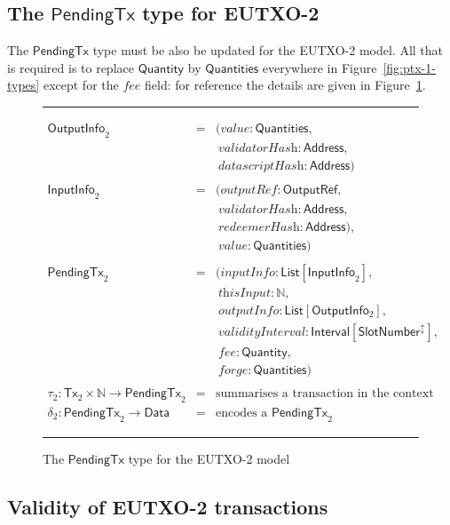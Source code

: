\documentclass[a4paper]{article}
\renewcommand{\i}{\textit}  %
\newcommand{\s}{\textsf}  %
\newcommand{\msf}[1]{\ensuremath{\mathsf{#1}}}
\newcommand{\mi}[1]{\ensuremath{\mathit{#1}}}
\newcommand\rfskip{7pt}
\newenvironment{ruledfigure}[1]{\begin{figure}[#1]\hrule\vspace{\rfskip}}{\vspace{\rfskip}\hrule\end{figure}}
\newcommand{\List}[1]{\ensuremath{\s{List}[#1]}}
\newcommand{\Interval}[1]{\ensuremath{\s{Interval}[#1]}}
\newcommand{\extended}[1]{#1^\updownarrow}
\newcommand{\ptx}{\ensuremath{\s{PendingTx}}}
\newcommand{\forge}{\mi{forge}}
\newcommand{\fee}{\mi{fee}}
\newcommand{\val}{\mi{value}}  %
\newcommand{\Data}{\ensuremath{\s{Data}}}
\newcommand{\outputref}{\mi{outputRef}}
\newcommand{\slotnum}{\ensuremath{\s{SlotNumber}}}
\newcommand{\eutxotx}{\msf{Tx}}
\newcommand{\qty}{\ensuremath{\s{Quantity}}}
\newcommand{\qtymap}{\ensuremath{\s{Quantities}}}
\newcommand\N{\ensuremath{\mathbb{N}}}
\begin{document}
\subsection{The \ptx{} type for EUTXO-2}
\label{sec:pendingtx-2}
The \ptx{} type must be also be updated for the EUTXO-2 model.  All
that is required is to replace \qty{} by \qtymap{} everywhere in
Figure~\ref{fig:ptx-1-types} except for the \fee{} field: for reference
the details are given in Figure~\ref{fig:ptx-2-types}.
\begin{ruledfigure}{H}
  \begin{displaymath}
  \begin{array}{rll}
    \s{OutputInfo}_2\s{ } &=&(\val: \qtymap,\\
                          & &\ \i{validatorHash}: \s{Address},\\
                          & &\ \i{datascriptHash}: \s{Address})\\
    \\
    \s{InputInfo}_2\s{ } &=& (\outputref: \s{OutputRef},\\
                         & &\ \i{validatorHash}: \s{Address},\\
                         & &\ \i{redeemerHash}: \s{Address}),\\
                         & &\ \val: \qtymap)\\
     \\
     \ptx_2\s{ } &=&(\i{inputInfo}: \List{\s{InputInfo}_2},\\
                 & &\ \i{thisInput}: \N,\\
                 & &\ \i{outputInfo}: \List{\s{OutputInfo$_2$}},\\
                 & &\ \i{validityInterval}: \Interval{\extended{\slotnum}},\\
                 & &\ \fee: \qty,\\
                 & &\ \forge: \qtymap)\\
    \\
    \tau_2: \eutxotx_2 \times \N \rightarrow \ptx_2 &=& \mbox{summarises a transaction in the context of an input}\\
    \delta_2: \ptx_2 \rightarrow \Data &=& \mbox{encodes a $\ptx_2$}
  \end{array}
  \end{displaymath}
  \caption{The \ptx{} type for the EUTXO-2 model}
  \label{fig:ptx-2-types}
\end{ruledfigure}

\subsection{Validity of EUTXO-2 transactions}
\label{sec:eutxo-2-validity}
\end{document}
